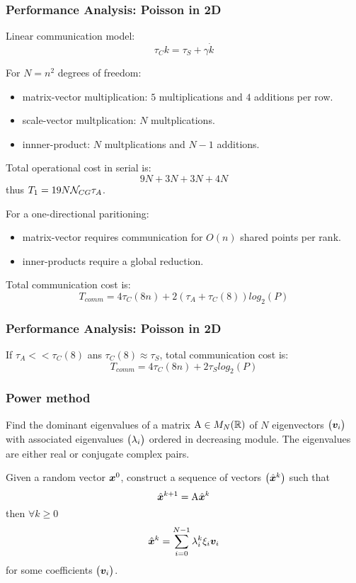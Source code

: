 \begin{frame}
  \frametitle{Performance Analysis: Poisson in 2D}

Linear communication model:
\[
\tau_C{k} = \tau_S + \gamma\dot k
\]

For $N = n^2$ degrees of freedom:
\begin{itemize}
\item matrix-vector multiplication: $5$ multiplications and $4$ additions per row.
\item scale-vector multplication: $N$ multplications.
\item innner-product: $N$ multplications and $N-1$ additions.
\end{itemize}

Total operational cost in serial is:
\[
9N + 3N + 3N + 4N
\]
thus $T_1 = 19N {\cal N}_{CG} \tau_A$.

\medskip
For a one-directional paritioning:
\begin{itemize}
\item matrix-vector requires communication for $O(n)$ shared points per rank.
\item inner-products require a global reduction.
\end{itemize}

Total communication cost is:
\[
T_{comm} = 4 \tau_C(8n) + 2(\tau_A + \tau_C(8)) log_2(P)
\]

\end{frame}

\begin{frame}
  \frametitle{Performance Analysis: Poisson in 2D}


If $\tau_A << \tau_C(8)$ ans $\tau_C(8) \approx \tau_S$, total communication cost is:
\[
T_{comm} = 4 \tau_C(8n) + 2\tau_S log_2(P)
\]

\end{frame}

\begin{frame}
  \frametitle{Power method}

Find the dominant eigenvalues of a matrix ${\mathrm A} \in {M_N(\mathbb{R})}$ of $N$ eigenvectors $\bigl({\boldsymbol v}_i\bigr)$ with associated eigenvalues $\bigl(\lambda_i\bigr)$ ordered in decreasing module.
The eigenvalues are either real or conjugate complex pairs.

\medskip
Given a random vector ${\boldsymbol x}^0$, construct a sequence of vectors $\bigl(\hat{\boldsymbol x}^k\bigr)$ such that
\[
\hat{\boldsymbol x}^{k+1} = {\mathrm A} \hat{\boldsymbol x}^k
\]
then $\forall k \geq 0$
\[
\hat{\boldsymbol x}^k = \sum_{i=0}^{N-1} \lambda_i^k \xi_i {\boldsymbol v}_i
\]
for some coefficients $\bigl({\boldsymbol v}_i\bigr)$.

\end{frame}

